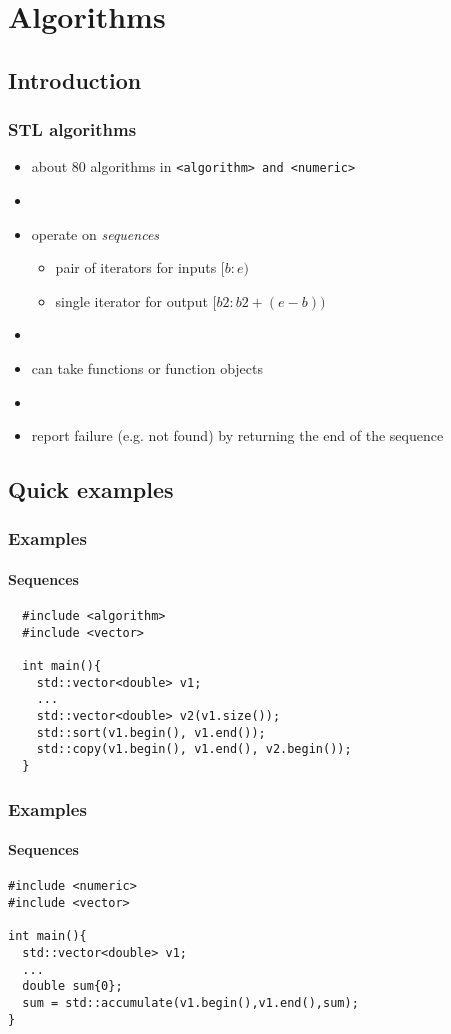 \section{Algorithms}
\subsection{Introduction}
\begin{frame}
  \frametitle{STL algorithms}
  \begin{itemize}
  \item about 80 algorithms in \texttt{<algorithm> and <numeric>}
  \item[]
  \item operate on \emph{sequences}
    \begin{itemize}
    \item pair of iterators for inputs $[b:e)$
    \item single iterator for output $[b2: b2+(e-b))$
    \end{itemize}
  \item[]
  \item can take functions or function objects
  \item[]
  \item report failure (e.g. not found) by returning the end of the sequence
  \end{itemize}
\end{frame}
\subsection{Quick examples}
\begin{frame}[fragile]
  \frametitle{Examples}
  \framesubtitle{Sequences}
\begin{lstlisting}
  #include <algorithm>
  #include <vector>
  
  int main(){
    std::vector<double> v1;
    ...
    std::vector<double> v2(v1.size());
    std::sort(v1.begin(), v1.end());
    std::copy(v1.begin(), v1.end(), v2.begin());
  }
\end{lstlisting}
\end{frame}

\begin{frame}[fragile]
  \frametitle{Examples}
  \framesubtitle{Sequences}
\begin{lstlisting}
#include <numeric>
#include <vector>
  
int main(){
  std::vector<double> v1;
  ...
  double sum{0};
  sum = std::accumulate(v1.begin(),v1.end(),sum);
}
\end{lstlisting}
\end{frame}

